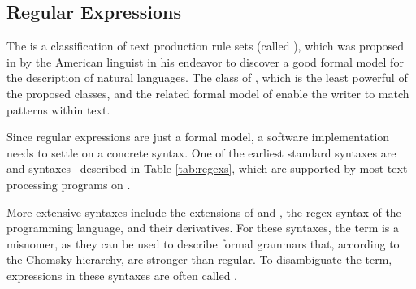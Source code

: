 \subsection{Regular Expressions}\label{sec:regexs}
The  is a classification
of text production rule sets (called ), which was
proposed~\cite{chomsky56} in \citeyear{chomsky56} by the American linguist
 in his endeavor to discover a good formal model for the
description of natural languages. The class of , which
is the least powerful of the proposed classes, and the related formal model of
 enable the writer to match patterns within text.

Since regular expressions are just a formal model, a software implementation
needs to settle on a concrete syntax. One of the earliest standard syntaxes are
 and  syntaxes~\cite[part~1,~ch.\,9]{iso93:posix2}
described in Table \ref{tab:regexs}, which are supported by most text processing
programs on \Unices.

More extensive syntaxes include the  extensions of 
and , the regex syntax of the  programming language, and
their derivatives. For these syntaxes, the term  is a misnomer,
as they can be used to describe formal grammars that, according to the Chomsky
hierarchy, are stronger than regular.
To disambiguate the term, expressions in these syntaxes are often called
.

\begin{table}
  
  \label{tab:regexs}
\end{table}


